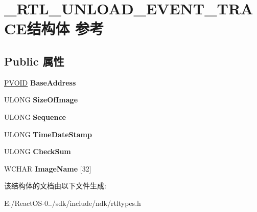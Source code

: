 \hypertarget{struct___r_t_l___u_n_l_o_a_d___e_v_e_n_t___t_r_a_c_e}{}\section{\+\_\+\+R\+T\+L\+\_\+\+U\+N\+L\+O\+A\+D\+\_\+\+E\+V\+E\+N\+T\+\_\+\+T\+R\+A\+C\+E结构体 参考}
\label{struct___r_t_l___u_n_l_o_a_d___e_v_e_n_t___t_r_a_c_e}
\subsection*{Public 属性}
\begin{DoxyCompactItemize}
\item 
\mbox{\label{struct___r_t_l___u_n_l_o_a_d___e_v_e_n_t___t_r_a_c_e_a041331afe9d1dc2afdc734f360048c50}} 
\hyperlink{interfacevoid}{P\+V\+O\+ID} {\bfseries Base\+Address}
\item 
\mbox{\label{struct___r_t_l___u_n_l_o_a_d___e_v_e_n_t___t_r_a_c_e_affd502370a41b61c03833f99cf9d926a}} 
U\+L\+O\+NG {\bfseries Size\+Of\+Image}
\item 
\mbox{\label{struct___r_t_l___u_n_l_o_a_d___e_v_e_n_t___t_r_a_c_e_a0a1cc3a943be233a8ab82006b446686d}} 
U\+L\+O\+NG {\bfseries Sequence}
\item 
\mbox{\label{struct___r_t_l___u_n_l_o_a_d___e_v_e_n_t___t_r_a_c_e_a05e20c2142ddf00bf9af9e48b23803eb}} 
U\+L\+O\+NG {\bfseries Time\+Date\+Stamp}
\item 
\mbox{\label{struct___r_t_l___u_n_l_o_a_d___e_v_e_n_t___t_r_a_c_e_aa3004b7d40ba5e7f1d7c8a9ef77d3c8e}} 
U\+L\+O\+NG {\bfseries Check\+Sum}
\item 
\mbox{\label{struct___r_t_l___u_n_l_o_a_d___e_v_e_n_t___t_r_a_c_e_aa888221d7a70e686b58ddb1cc88ef3c8}} 
W\+C\+H\+AR {\bfseries Image\+Name} \mbox{[}32\mbox{]}
\end{DoxyCompactItemize}


该结构体的文档由以下文件生成\+:\begin{DoxyCompactItemize}
\item 
E\+:/\+React\+O\+S-\/0../sdk/include/ndk/rtltypes.\+h\end{DoxyCompactItemize}

